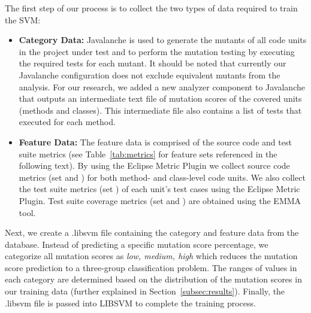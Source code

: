 \documentclass[conference]{IEEEtran}
\begin{document}
The first step of our process is to collect the two types of data required to train the SVM:

\begin{itemize}
  \item \textbf{Category Data:} Javalanche is used to generate the mutants of all code units in the project under test and to perform the mutation testing by executing the required tests for each mutant. It should be noted that currently our Javalanche configuration does not exclude equivalent mutants from the analysis. For our research, we added a new analyzer component to Javalanche that outputs an intermediate text file of mutation scores of the covered units (methods and classes). This intermediate file also contains a list of tests that executed for each method.

  \item \textbf{Feature Data:} The feature data is comprised of the source code and test suite metrics (see Table~\ref{tab:metrics} for feature sets referenced in the following text). By using the Eclipse Metric Plugin we collect source code metrics (set  and ) for both method- and class-level code units. We also collect the test suite metrics (set ) of each unit's test cases using the Eclipse Metric Plugin. Test suite coverage metrics (set  and ) are obtained using the EMMA tool.

\end{itemize}

Next, we create a .libsvm file containing the category and feature data from the database. Instead of predicting a specific mutation score percentage, we categorize all mutation scores as \textit{low, medium, high} which reduces the mutation score prediction to a three-group classification problem. The ranges of values in each category are determined based on the distribution of the mutation scores in our training data (further explained in Section~\ref{subsec:results}). Finally, the .libsvm file is passed into LIBSVM to complete the training process.
\end{document}
